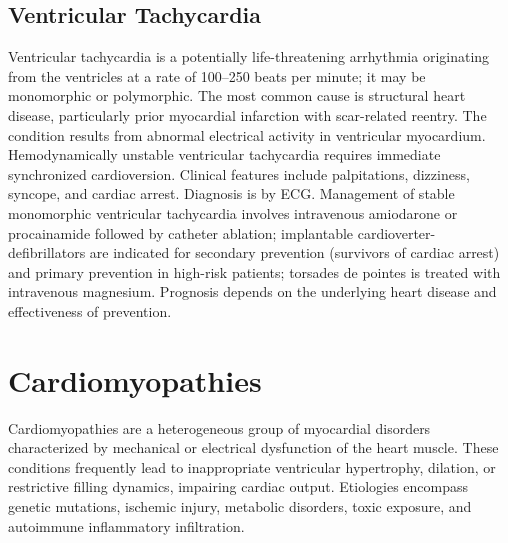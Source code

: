 \subsection{Ventricular Tachycardia}
\label{sec:Ventricular Tachycardia}
Ventricular tachycardia is a potentially life-threatening arrhythmia originating from the ventricles at a rate of 100--250 beats per minute; it may be monomorphic or polymorphic. The most common cause is structural heart disease, particularly prior myocardial infarction with scar-related reentry. The condition results from abnormal electrical activity in ventricular myocardium. Hemodynamically unstable ventricular tachycardia requires immediate synchronized cardioversion. Clinical features include palpitations, dizziness, syncope, and cardiac arrest. Diagnosis is by ECG. Management of stable monomorphic ventricular tachycardia involves intravenous amiodarone or procainamide followed by catheter ablation; implantable cardioverter-defibrillators are indicated for secondary prevention (survivors of cardiac arrest) and primary prevention in high-risk patients; torsades de pointes is treated with intravenous magnesium. Prognosis depends on the underlying heart disease and effectiveness of prevention.

\section{Cardiomyopathies}




Cardiomyopathies are a heterogeneous group of myocardial disorders characterized by mechanical or electrical dysfunction of the heart muscle. These conditions frequently lead to inappropriate ventricular hypertrophy, dilation, or restrictive filling dynamics, impairing cardiac output. Etiologies encompass genetic mutations, ischemic injury, metabolic disorders, toxic exposure, and autoimmune inflammatory infiltration.



